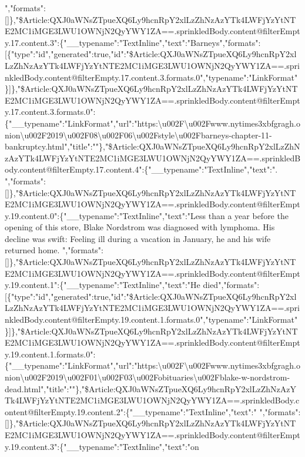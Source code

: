 ","formats":{[}{]}\},"\$Article:QXJ0aWNsZTpueXQ6Ly9hcnRpY2xlLzZhNzAzYTk4LWFjYzYtNTE2MC1iMGE3LWU1OWNjN2QyYWY1ZA==.sprinkledBody.content@filterEmpty.17.content.3":\{"\_\_typename":"TextInline","text":"Barneys","formats":{[}\{"type":"id","generated":true,"id":"\$Article:QXJ0aWNsZTpueXQ6Ly9hcnRpY2xlLzZhNzAzYTk4LWFjYzYtNTE2MC1iMGE3LWU1OWNjN2QyYWY1ZA==.sprinkledBody.content@filterEmpty.17.content.3.formats.0","typename":"LinkFormat"\}{]}\},"\$Article:QXJ0aWNsZTpueXQ6Ly9hcnRpY2xlLzZhNzAzYTk4LWFjYzYtNTE2MC1iMGE3LWU1OWNjN2QyYWY1ZA==.sprinkledBody.content@filterEmpty.17.content.3.formats.0":\{"\_\_typename":"LinkFormat","url":"https:\textbackslash{}u002F\textbackslash{}u002Fwww.nytimes3xbfgragh.onion\textbackslash{}u002F2019\textbackslash{}u002F08\textbackslash{}u002F06\textbackslash{}u002Fstyle\textbackslash{}u002Fbarneys-chapter-11-bankruptcy.html","title":""\},"\$Article:QXJ0aWNsZTpueXQ6Ly9hcnRpY2xlLzZhNzAzYTk4LWFjYzYtNTE2MC1iMGE3LWU1OWNjN2QyYWY1ZA==.sprinkledBody.content@filterEmpty.17.content.4":\{"\_\_typename":"TextInline","text":".
","formats":{[}{]}\},"\$Article:QXJ0aWNsZTpueXQ6Ly9hcnRpY2xlLzZhNzAzYTk4LWFjYzYtNTE2MC1iMGE3LWU1OWNjN2QyYWY1ZA==.sprinkledBody.content@filterEmpty.19.content.0":\{"\_\_typename":"TextInline","text":"Less
than a year before the opening of this store, Blake Nordstrom was
diagnosed with lymphoma. His decline was swift: Feeling ill during a
vacation in January, he and his wife returned home.
","formats":{[}{]}\},"\$Article:QXJ0aWNsZTpueXQ6Ly9hcnRpY2xlLzZhNzAzYTk4LWFjYzYtNTE2MC1iMGE3LWU1OWNjN2QyYWY1ZA==.sprinkledBody.content@filterEmpty.19.content.1":\{"\_\_typename":"TextInline","text":"He
died","formats":{[}\{"type":"id","generated":true,"id":"\$Article:QXJ0aWNsZTpueXQ6Ly9hcnRpY2xlLzZhNzAzYTk4LWFjYzYtNTE2MC1iMGE3LWU1OWNjN2QyYWY1ZA==.sprinkledBody.content@filterEmpty.19.content.1.formats.0","typename":"LinkFormat"\}{]}\},"\$Article:QXJ0aWNsZTpueXQ6Ly9hcnRpY2xlLzZhNzAzYTk4LWFjYzYtNTE2MC1iMGE3LWU1OWNjN2QyYWY1ZA==.sprinkledBody.content@filterEmpty.19.content.1.formats.0":\{"\_\_typename":"LinkFormat","url":"https:\textbackslash{}u002F\textbackslash{}u002Fwww.nytimes3xbfgragh.onion\textbackslash{}u002F2019\textbackslash{}u002F01\textbackslash{}u002F03\textbackslash{}u002Fobituaries\textbackslash{}u002Fblake-w-nordstrom-dead.html","title":""\},"\$Article:QXJ0aWNsZTpueXQ6Ly9hcnRpY2xlLzZhNzAzYTk4LWFjYzYtNTE2MC1iMGE3LWU1OWNjN2QyYWY1ZA==.sprinkledBody.content@filterEmpty.19.content.2":\{"\_\_typename":"TextInline","text":"
","formats":{[}{]}\},"\$Article:QXJ0aWNsZTpueXQ6Ly9hcnRpY2xlLzZhNzAzYTk4LWFjYzYtNTE2MC1iMGE3LWU1OWNjN2QyYWY1ZA==.sprinkledBody.content@filterEmpty.19.content.3":\{"\_\_typename":"TextInline","text":"on
